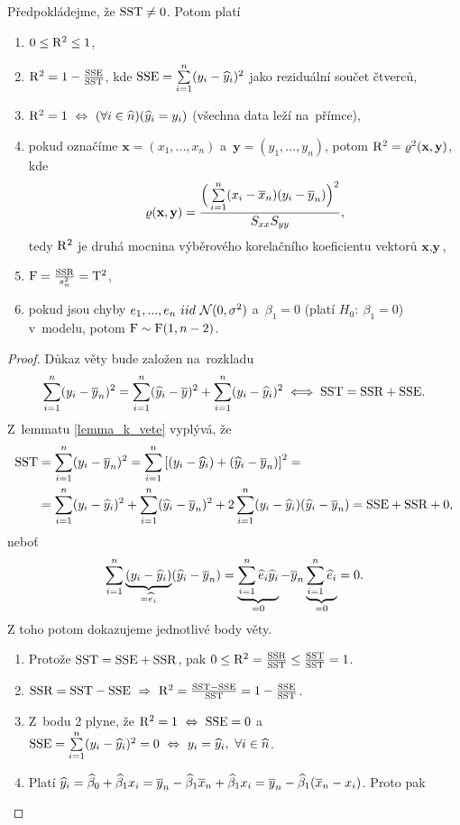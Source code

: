 \begin{theorem}\label{vetasbysxx}
	Předpokládejme, že $\mathrm{SST}\neq 0$. Potom platí\begin{enumerate}
		\item $0\leq \mathrm{R}^2\leq1$,
		\item $\mathrm{R}^2 = 1-\frac{\mathrm{SSE}}{\mathrm{SST}}$, kde $\mathrm{SSE} = \sum\limits_{i=1}^{n} (y_i-\widehat{y}_i)^2$ jako reziduální součet čtverců,
		\item $\mathrm{R}^2 = 1~\Leftrightarrow~(\forall i\in\widehat{n})(\widehat{y}_i = y_i)$ (všechna data leží na~přímce),
		\item pokud označíme $\textbf{x} = (x_1,...,x_n)$ a~$\textbf{y} = (y_1,...,y_n)$, potom $\mathrm{R}^2 = \varrho^2(\textbf{x},\textbf{y})$, kde $$ \varrho(\textbf{x},\textbf{y}) = \frac{ \Big( \sum\limits_{i=1}^{n} (x_i-\overline{x}_n)(y_i-\overline{y}_n) \Big)^2}{S_{xx} S_{yy}}, $$ tedy $\mathrm{R}^2$ je druhá mocnina výběrového korelačního koeficientu vektorů $\textbf{x},\textbf{y}$,
		\item $\mathrm{F} = \frac{\mathrm{SSR}}{s_n^2} = \mathrm{T}^2$,
		\item pokud jsou chyby $e_1,...,e_n~iid~\mathcal{N}(0,\sigma^2)$ a~$\beta_1 = 0$ (platí $H_0:~\beta_1 = 0$) v~modelu, potom $\mathrm{F}\sim\mathrm{F}(1,n-2)$.
	\end{enumerate}
\begin{proof}
	Důkaz věty bude založen na~rozkladu
	 $$ \sum\limits_{i=1}^{n} (y_i-\overline{y}_n)^2  = \sum\limits_{i=1}^{n} (\widehat{y}_i-\overline{y})^2 + \sum\limits_{i=1}^{n} (y_i-\widehat{y}_i)^2 \iff \mathrm{SST} = \mathrm{SSR}+\mathrm{SSE}.$$
	 Z~lemmatu \ref{lemma_k_vete} vyplývá, že
	\[
	\begin{split}
	\mathrm{SST}& = \sum\limits_{i=1}^{n} (y_i-\overline{y}_n)^2 = \sum\limits_{i=1}^{n} \left[(y_i-\widehat{y}_i)+(\widehat{y}_i-\overline{y}_n) \right]^2 = \\& = \sum\limits_{i=1}^{n} (y_i-\widehat{y}_i)^2+\sum\limits_{i=1}^{n} (\widehat{y}_i-\overline{y}_n)^2+2\sum\limits_{i=1}^{n} (y_i-\widehat{y}_i)(\widehat{y}_i-\overline{y}_n) = \mathrm{SSE}+\mathrm{SSR}+0,
	\end{split}
	\]
	neboť $$ \sum\limits_{i=1}^{n} \underbrace{(y_i-\widehat{y}_i)}_{ = \widehat{e}_i}(\widehat{y}_i-\overline{y}_n) = \underbrace{\sum\limits_{i=1}^{n} \widehat{e}_i\widehat{y}_i}_{ = 0}-\overline{y}_n\underbrace{\sum\limits_{i=1}^{n} \widehat{e}_i}_{ = 0} = 0. $$
	Z toho potom dokazujeme jednotlivé body věty. \begin{enumerate}
		\item Protože $\mathrm{SST} = \mathrm{SSE}+\mathrm{SSR}$, pak $0\leq \mathrm{R}^2 = \frac{\mathrm{SSR}}{\mathrm{SST}}\leq \frac{\mathrm{SST}}{\mathrm{SST}} = 1$.
		\item $\mathrm{SSR} = \mathrm{SST}-\mathrm{SSE}~\Rightarrow~\mathrm{R}^2 = \frac{\mathrm{SST}-\mathrm{SSE}}{\mathrm{SST}} = 1-\frac{\mathrm{SSE}}{\mathrm{SST}}$.
		\item Z~bodu 2 plyne, že $\mathrm{R}^2 = 1~\Leftrightarrow~\mathrm{SSE} = 0$ a~$\mathrm{SSE} = \sum\limits_{i=1}^{n} (y_i-\widehat{y}_i)^2 = 0~\Leftrightarrow~y_i = \widehat{y}_i, ~\forall i\in\widehat{n}$.
		\item Platí $\widehat{y}_i = \widehat{\beta}_0 + \widehat{\beta}_1 x_i = \overline{y}_n-\widehat{\beta}_1 \overline{x}_n + \widehat{\beta}_1 x_i = \overline{y}_n-\widehat{\beta}_1(\overline{x}_n-x_i)$. Proto pak

\end{enumerate}
\end{proof}
\end{theorem}
